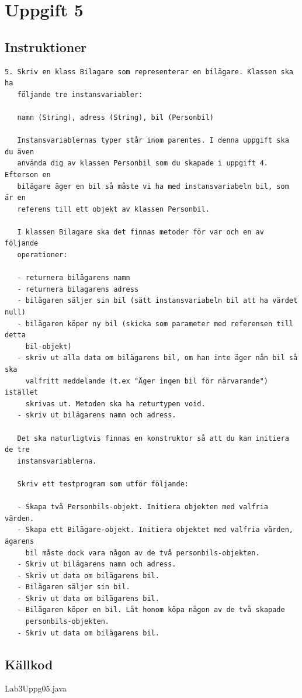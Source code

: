 \section{Uppgift 5}\label{sec:uppg05}

\subsection{Instruktioner}
\begin{verbatim}
5. Skriv en klass Bilagare som representerar en bilägare. Klassen ska ha
   följande tre instansvariabler:
   
   namn (String), adress (String), bil (Personbil)
   
   Instansvariablernas typer står inom parentes. I denna uppgift ska du även
   använda dig av klassen Personbil som du skapade i uppgift 4. Efterson en
   bilägare äger en bil så måste vi ha med instansvariabeln bil, som är en
   referens till ett objekt av klassen Personbil.
   
   I klassen Bilagare ska det finnas metoder för var och en av följande
   operationer:
   
   - returnera bilägarens namn
   - returnera bilagarens adress
   - bilägaren säljer sin bil (sätt instansvariabeln bil att ha värdet null)
   - bilägaren köper ny bil (skicka som parameter med referensen till detta
     bil-objekt)
   - skriv ut alla data om bilägarens bil, om han inte äger nån bil så ska
     valfritt meddelande (t.ex "Äger ingen bil för närvarande") istället
     skrivas ut. Metoden ska ha returtypen void.
   - skriv ut bilägarens namn och adress.
   
   Det ska naturligtvis finnas en konstruktor så att du kan initiera de tre
   instansvariablerna.
   
   Skriv ett testprogram som utför följande:
   
   - Skapa två Personbils-objekt. Initiera objekten med valfria värden.
   - Skapa ett Bilägare-objekt. Initiera objektet med valfria värden, ägarens
     bil måste dock vara någon av de två personbils-objekten.
   - Skriv ut bilägarens namn och adress.
   - Skriv ut data om bilägarens bil.
   - Bilägaren säljer sin bil.
   - Skriv ut data om bilägarens bil.
   - Bilägaren köper en bil. Låt honom köpa någon av de två skapade
     personbils-objekten.
   - Skriv ut data om bilägarens bil.
\end{verbatim}


\subsection{Källkod}
\caption{Lab3Uppg05.java}
\label{src:uppg05}

